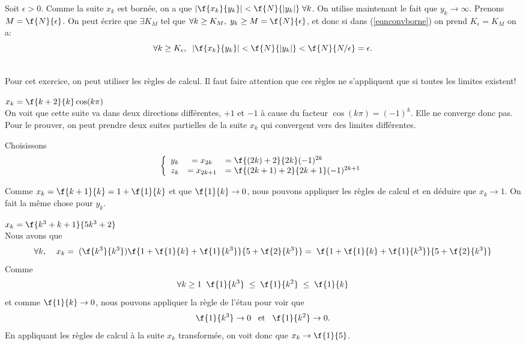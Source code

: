 \noindent Soit $\epsilon >0$. Comme la suite $x_k$ est bornée, on a que  $|\f{x_k}{y_k}|<\f{N}{|y_k|}\; \forall k$. On utilise maintenant le fait que $y_k \longrightarrow \infty$. Prenons $M=\f{N}{\epsilon}$. On peut écrire que $\exists K_M$ tel que $\forall k \geq K_M, \; y_k \geq M=\f{N}{\epsilon}$, et donc si dans (\ref{eqnconvborne}) on prend $K_\epsilon= K_M$ on a:\[\forall k \geq K_\epsilon,\; \; |\f{x_k}{y_k}|<\f{N}{|y_k|}<\f{N}{N/\epsilon}=\epsilon.\]



\\

\noindent Pour cet exercice, on peut utiliser les règles de calcul. Il faut faire attention que ces règles ne s'appliquent que si toutes les limites existent!

\vspace{0.5cm}
 $x_k = \f{k+2}{k}\cos(k\pi)$\\

\noindent On voit que cette suite va dans deux directions différentes, $+1$ et $-1$ à cause du facteur $\cos(k\pi)=(-1)^k$. Elle ne converge donc pas. Pour le prouver, on peut prendre deux suites partielles de la suite $x_k$ qui convergent vers des limites différentes. 

\noindent Choisissons \[\left\{ \begin{array}{rcl} y_k &= x_{2k}&= \f{(2k)+2}{2k}(-1)^{2k}\\
 							  z_k &= x_{2k+1} &= \f{(2k+1)+2}{2k+1} (-1)^{2k+1}\end{array}\right.\]

\noindent Comme $x_k =\f{k+1}{k}= 1+\f{1}{k}$	et que $\f{1}{k} \rightarrow  0$, nous pouvons appliquer les règles de calcul et en déduire que $x_k \rightarrow  1$. On fait la même chose pour $y_k$.				  


\vspace{0.5cm}
 $x_k = \f{k^3+k+1}{5k^3+2}$\\

\noindent Nous avons que \[\forall k, \;\;\;\;x_k =\; (\f{k^3}{k^3})\f{1+\f{1}{k} +\f{1}{k^3}}{5+\f{2}{k^3}}=\;\f{1+\f{1}{k} +\f{1}{k^3}}{5+\f{2}{k^3}} \]
Comme \[\forall k \geq 1\;\; \f{1}{k^3} \; \leq \;\f{1}{k^2}\; \leq \; \f{1}{k}\] et comme $\f{1}{k}\rightarrow 0$, nous pouvons appliquer la règle de l'étau pour voir que \[\f{1}{k^3} \rightarrow 0 \; \; \; {\rm et } \;\; \;\f{1}{k^2} \rightarrow 0.\]
En appliquant les règles de calcul à la suite $x_k$ transformée, on voit donc que $x_k \rightarrow  \f{1}{5}$.

